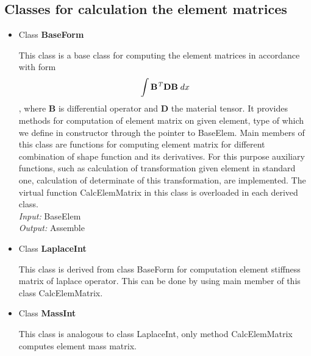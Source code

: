 \subsection{ Classes for calculation the element matrices}
\begin{itemize}
%
\item{ Class {\bf BaseForm}} \\
\begin{print}
 This class is a base class for computing the element matrices in accordance with form  
\begin{eqnarray*}
\int {\bf B}^{\it T}{\bf D}{\bf B} \; dx
\end{eqnarray*}
, where {\bf B} is differential operator and {\bf D} the material tensor.
 It provides methods for computation of element matrix on given element, type of which we define in constructor through the pointer to BaseElem. Main members of this class are functions for computing element matrix for different combination of shape function and its derivatives. For this purpose auxiliary functions, such as calculation of transformation given element in standard one, calculation of determinate of this transformation, are implemented. The virtual function CalcElemMatrix in this class is overloaded in each derived class. \\    
{\it Input: } BaseElem \\
{\it Output: } Assemble
\end{print} 
%
\item{ Class {\bf LaplaceInt}}\\
\begin{print}
 This class is derived from class BaseForm for computation element stiffness matrix of laplace operator. This can be done by using main member of this class {\sf CalcElemMatrix}.
\end{print}
%
\item{ Class {\bf MassInt}}\\
\begin{print}
 This class is analogous to class LaplaceInt, only method {\sf CalcElemMatrix} computes element mass matrix.
\end{print}
\end{itemize} 
%
